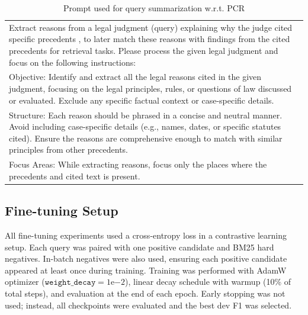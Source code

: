 \begin{table}
    \centering
    \begin{tabular}{|p{}|}
    \hline
    Extract reasons from a legal judgment (query) explaining why the judge cited specific precedents
                    , to later match these reasons with findings from the cited precedents for retrieval tasks.
                    Please process the given legal judgment and focus on the following instructions:
\\
                    Objective: Identify and extract all the legal reasons cited in the given judgment, 
                    focusing on the legal principles, rules, or questions of law discussed or evaluated. 
                    Exclude any specific factual context or case-specific details.
\\
                    Structure: Each reason should be phrased in a concise and neutral manner.
                            Avoid including case-specific details (e.g., names, dates, or specific statutes cited).
                            Ensure the reasons are comprehensive enough to match with similar principles from other precedents.
\\
                    Focus Areas: While extracting reasons, focus only the places where the precedents and cited text is present. \\ \hline
    \end{tabular}
    \caption{Prompt used for query summarization w.r.t. PCR}
    \label{tab:qry-summ-prompt-precwise}
\end{table}

\subsection{Fine-tuning Setup} \label{sec:expt/implementation/ft}

All fine-tuning experiments used a cross-entropy loss in a contrastive learning setup. Each query was paired with one positive candidate and BM25 hard negatives. In-batch negatives were also used, ensuring each positive candidate appeared at least once during training. %
Training was performed with AdamW optimizer ($\texttt{weight\_decay}=1\mathrm{e}{-2}$), linear decay schedule with warmup (10\% of total steps), and evaluation at the end of each epoch. Early stopping was not used; instead, all checkpoints were evaluated and the best dev F1 was selected.  

